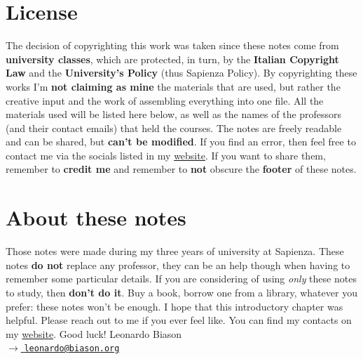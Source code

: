 \section*{License}

\doclicenseThis
The decision of copyrighting this work was taken since these notes come from \textbf{university classes}, which are protected, in turn, by the \textbf{Italian Copyright Law} and the \textbf{University's Policy} (thus Sapienza Policy). By copyrighting these works I'm \textbf{not claiming as mine} the materials that are used, but rather the creative input and the work of assembling everything into one file.
\nl
All the materials used will be listed here below, as well as the names of the professors (and their contact emails) that held the courses.
\nl
The notes are freely readable and can be shared, but \textbf{can't be modified}. If you find an error, then feel free to contact me via the socials listed in my \href{https://www.leonardobiason.com}{website}. If you want to share them, remember to \textbf{credit me} and remember to \textbf{not} obscure the \textbf{footer} of these notes.

\section*{About these notes}

Those notes were made during my three years of university at Sapienza. These notes \textbf{do not} replace any professor, they can be an help though when having to remember some particular details. If you are considering of using \textit{only} these notes to study, then \textbf{don't do it}. Buy a book, borrow one from a library, whatever you prefer: these notes won't be enough.
\nl
I hope that this introductory chapter was helpful. Please reach out to me if you ever feel like. You can find my contacts on my \href{https://www.leonardobiason.com}{website}. Good luck! \nl
Leonardo Biason\\
{\footnotesize \href{mailto:leonardo@biason.org}{$\to$ \texttt{leonardo@biason.org}}}